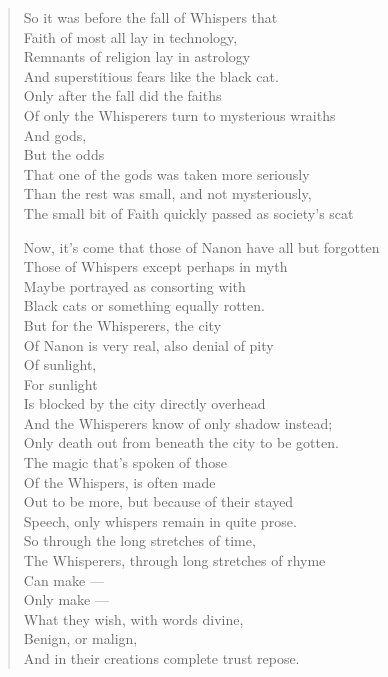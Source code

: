 \begin{leftcolumn}
\begin{verse}
So it was before the fall of Whispers that\\
\vin Faith of most all lay in technology,\\
\vin Remnants of religion lay in astrology\\
And superstitious fears like the black cat.\\
\vin Only after the fall did the faiths\\
\vin Of only the Whisperers turn to mysterious wraiths\\
\vin \vin And gods,\\
\vin \vin But the odds\\
\vin That one of the gods was taken more seriously\\
\vin Than the rest was small, and not mysteriously,\\
The small bit of Faith quickly passed as society's scat

Now, it's come that those of Nanon have all but forgotten\\
\vin Those of Whispers except perhaps in myth\\
\vin Maybe portrayed as consorting with\\
Black cats or something equally rotten.\\
\vin But for the Whisperers, the city\\
\vin Of Nanon is very real, also denial of pity\\
\vin \vin Of sunlight,\\
\vin \vin For sunlight\\
\vin Is blocked by the city directly overhead\\
\vin And the Whisperers know of only shadow instead;\\
Only death out from beneath the city to be gotten.\\

The magic that's spoken of those\\
\vin Of the Whispers, is often made\\
\vin Out to be more, but because of their stayed\\
Speech, only whispers remain in quite prose.\\
\vin So through the long stretches of time,\\
\vin The Whisperers, through long stretches of rhyme\\
\vin \vin Can make ---\\
\vin \vin Only make ---\\
\vin What they wish, with words divine,\\
\vin Benign, or malign,\\
And in their creations complete trust repose.


\end{verse}
\end{leftcolumn}
